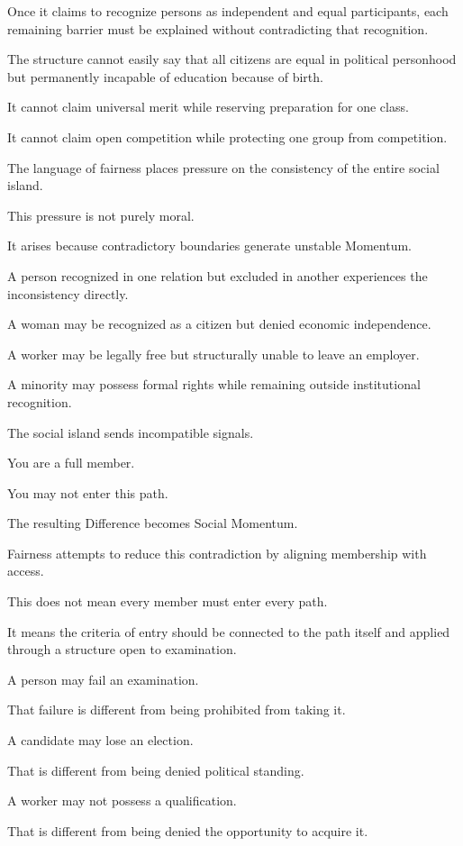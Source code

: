 Once it claims to recognize persons as independent and equal participants, each remaining barrier must be explained without contradicting that recognition.

The structure cannot easily say that all citizens are equal in political personhood but permanently incapable of education because of birth.

It cannot claim universal merit while reserving preparation for one class.

It cannot claim open competition while protecting one group from competition.

The language of fairness places pressure on the consistency of the entire social island.

This pressure is not purely moral.

It arises because contradictory boundaries generate unstable Momentum.

A person recognized in one relation but excluded in another experiences the inconsistency directly.

A woman may be recognized as a citizen but denied economic independence.

A worker may be legally free but structurally unable to leave an employer.

A minority may possess formal rights while remaining outside institutional recognition.

The social island sends incompatible signals.

You are a full member.

You may not enter this path.

The resulting Difference becomes Social Momentum.

Fairness attempts to reduce this contradiction by aligning membership with access.

This does not mean every member must enter every path.

It means the criteria of entry should be connected to the path itself and applied through a structure open to examination.

A person may fail an examination.

That failure is different from being prohibited from taking it.

A candidate may lose an election.

That is different from being denied political standing.

A worker may not possess a qualification.

That is different from being denied the opportunity to acquire it.

